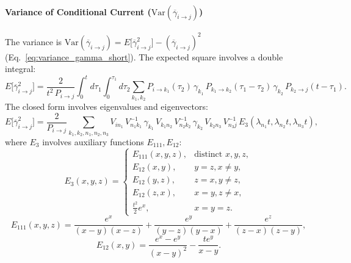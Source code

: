 \documentclass[pdflatex,sn-nature]{sn-jnl}%
\begin{document}
\paragraph{Variance of Conditional Current (\(\mathrm{Var}(\overline{\gamma}_{i\rightarrow j})\))}
The variance is \( \mathrm{Var}(\overline{\gamma}_{i\rightarrow j}) = E\bigl[\overline{\gamma}_{i\rightarrow j}^2\bigr] - (\overline{\gamma}_{i \rightarrow j})^2 \) (Eq.~\ref{eq:variance_gamma_short}). The expected square involves a double integral:
\begin{equation}
E\bigl[\overline{\gamma}_{i\rightarrow j}^2\bigr] = \frac{2}{t^2\,P_{i\rightarrow j}} \int_0^t d\tau_1 \int_0^{\tau_1} d\tau_2 \sum_{k_1,k_2} P_{i\rightarrow k_1}(\tau_2)\,\gamma_{k_1}\,P_{k_1\rightarrow k_2}(\tau_1-\tau_2)\,\gamma_{k_2}\,P_{k_2\rightarrow j}(t-\tau_1). %
\label{eq:expected_square_integral_short} %
\end{equation}
The closed form involves eigenvalues and eigenvectors:
\begin{equation}
    E\bigl[\overline{\gamma}_{i\rightarrow j}^2\bigr] = \frac{2}{P_{i\rightarrow j}} \sum_{k_1,k_2,n_1,n_2,n_3} V_{i n_1}\,V^{-1}_{n_1 k_1}\,\gamma_{k_1}\,V_{k_1 n_2}\,V^{-1}_{n_2 k_2}\,\gamma_{k_2}\,V_{k_2 n_3}\,V^{-1}_{n_3 j}\,E_3(\lambda_{n_1}t,\lambda_{n_2}t,\lambda_{n_3}t), %
\label{eq:expected_square_closed_short}
\end{equation}
where \(E_3\) involves auxiliary functions \(E_{111}, E_{12}\):
\begin{equation}
E_3(x,y,z)= %
\begin{cases}
 E_{111}(x,y,z), & \text{distinct } x,y,z,\\
 E_{12}(x,y),  & y=z, x \neq y,\\
 E_{12}(y,z),  & z=x, y \neq z,\\
 E_{12}(z,x),  & x=y, z \neq x,\\
 \frac{t^2}{2}e^x, & x=y=z. %
\end{cases}
\label{eq:E3_short}
\end{equation}
\begin{equation}
E_{111}(x,y,z)= \frac{e^x}{(x-y)(x-z)} +\frac{e^y}{(y-z)(y-x)} + \frac{e^z}{(z-x)(z-y)}, %
\label{eq:E111_short}
\end{equation}
\begin{equation}
E_{12}(x,y)= \frac{e^x - e^y}{(x-y)^2} - \frac{t e^y}{x-y}. %
\label{eq:E12_short} %
\end{equation}
\end{document}
